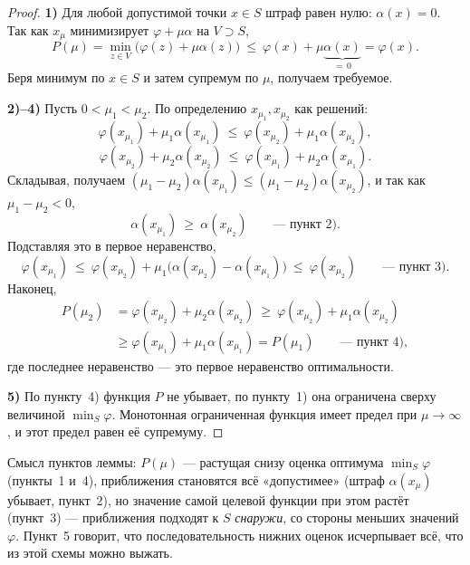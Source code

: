 
\begin{proof}
\textbf{1)} Для любой допустимой точки $x \in S$ штраф равен нулю:
$\alpha(x) = 0$. Так как $x_\mu$ минимизирует $\varphi + \mu\alpha$ на $V
\supset S$,
\[
  P(\mu) = \min_{z \in V}\big(\varphi(z) + \mu\alpha(z)\big)
  \ \le\ \varphi(x) + \mu\underbrace{\alpha(x)}_{=\,0} = \varphi(x) .
\]
Беря минимум по $x \in S$ и затем супремум по $\mu$, получаем требуемое.

\medskip
\textbf{2)--4)} Пусть $0 < \mu_1 < \mu_2$. По определению $x_{\mu_1}, x_{\mu_2}$
как решений:
\[
  \varphi(x_{\mu_1}) + \mu_1 \alpha(x_{\mu_1})
  \ \le\ \varphi(x_{\mu_2}) + \mu_1 \alpha(x_{\mu_2}) ,
\]
\[
  \varphi(x_{\mu_2}) + \mu_2 \alpha(x_{\mu_2})
  \ \le\ \varphi(x_{\mu_1}) + \mu_2 \alpha(x_{\mu_1}) .
\]
Складывая, получаем
$(\mu_1 - \mu_2)\alpha(x_{\mu_1}) \le (\mu_1 - \mu_2)\alpha(x_{\mu_2})$, и так
как $\mu_1 - \mu_2 < 0$,
\[
  \alpha(x_{\mu_1}) \ \ge\ \alpha(x_{\mu_2})
  \qquad \text{— пункт 2)} .
\]
Подставляя это в первое неравенство,
\[
  \varphi(x_{\mu_1}) \ \le\ \varphi(x_{\mu_2})
    + \mu_1\big(\alpha(x_{\mu_2}) - \alpha(x_{\mu_1})\big)
  \ \le\ \varphi(x_{\mu_2})
  \qquad \text{— пункт 3)} .
\]
Наконец,
\begin{align*}
  P(\mu_2) &= \varphi(x_{\mu_2}) + \mu_2\alpha(x_{\mu_2})
   \ \ge\ \varphi(x_{\mu_2}) + \mu_1\alpha(x_{\mu_2}) \\
  &\ge \varphi(x_{\mu_1}) + \mu_1\alpha(x_{\mu_1}) = P(\mu_1)
   \qquad \text{— пункт 4)} ,
\end{align*}
где последнее неравенство — это первое неравенство оптимальности.

\medskip
\textbf{5)} По пункту~4) функция $P$ не убывает, по пункту~1) она ограничена
сверху величиной $\min_S \varphi$. Монотонная ограниченная функция имеет предел
при $\mu \to \infty$, и этот предел равен её супремуму.
\end{proof}

\begin{idea}
Смысл пунктов леммы: $P(\mu)$ — растущая снизу оценка оптимума
$\min_S\varphi$ (пункты~1 и~4), приближения становятся всё «допустимее»
(штраф $\alpha(x_\mu)$ убывает, пункт~2), но значение самой целевой функции
при этом растёт (пункт~3) — приближения подходят к $S$ \emph{снаружи}, со
стороны меньших значений $\varphi$. Пункт~5 говорит, что последовательность
нижних оценок исчерпывает всё, что из этой схемы можно выжать.
\end{idea}

